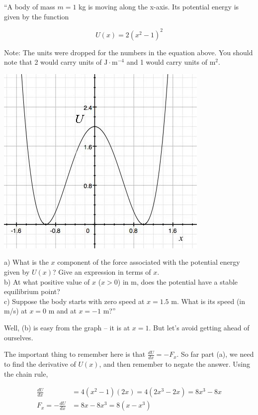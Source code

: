 \documentclass[8.01x]{subfiles}
\begin{document}
``A body of mass $m = 1$ kg is moving along the x-axis. Its potential energy is given by the function

\begin{equation*}
U(x) = 2 (x^2 - 1)^2
\end{equation*}

Note: The units were dropped for the numbers in the equation above. You should note that 2 would carry units of $\text{J} \cdot \text{m}^{-4}$ and 1 would carry units of $\text{m}^2$.

\begin{center}
\includegraphics[scale=0.75]{Graphics/h5p6}
\end{center}

a) What is the $x$ component of the force associated with the potential energy given by $U(x)$? Give an expression in terms of $x$.\\
b) At what positive value of $x$ ($x > 0$) in m, does the potential have a stable equilibrium point?\\
c) Suppose the body starts with zero speed at $x = 1.5$ m. What is its speed (in m/s) at $x = 0$ m and at $x = -1$ m?''

Well, (b) is easy from the graph -- it is at $x = 1$. But let's avoid getting ahead of ourselves.

The important thing to remember here is that $\displaystyle \frac{dU}{dx} = - F_x$. So far part (a), we need to find the derivative of $U(x)$, and then remember to negate the answer. Using the chain rule,

\begin{align}
\frac{dU}{dx} &= 4(x^2 - 1)(2x) = 4(2x^3 - 2x) = 8x^3 - 8x\\
F_x = - \frac{dU}{dx} &= 8x - 8x^3 = 8(x - x^3)
\end{align}
\end{document}
